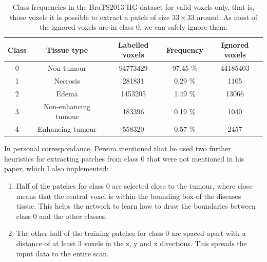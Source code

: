 \documentclass[12pt,a4paper,twoside,openright]{report}
\begin{document}
\begin{enumerate}
		\begin{table}[h]
		\centering	
		\begin{tabular}{c c S[table-format=9.0] S[table-format=2.2] S[table-format=8.0]}
		\textbf{Class} & \textbf{Tissue type} & \textbf{Labelled voxels} & \textbf{Frequency} & \textbf{Ignored voxels}\\
		  & Non tumour 				& 94773429 	& 97.45 \% & 44185403 \\ 
		1 & Necrosis 				& 281831 	& 0.29 \% & 1105\\ 
		2 & Edema					& 1453205 	& 1.49 \% & 13066\\ 
		3 & Non-enhancing tumour 	& 183396 	& 0.19 \% & 1040\\ 
		4 & Enhancing tumour		& 558320 	& 0.57 \% & 2457\\
		\end{tabular}
		\caption{Class frequencies in the BraTS2013 HG dataset for valid voxels only, that is, those voxels it is possible to extract a patch of size $33 \times 33$ around. As most of the ignored voxels are in class 0, we can safely ignore them.}
		\label{table:valid_class_frequencies}
		\end{table}
\end{enumerate}

In personal correspondance, Pereira mentioned that he used two further heuristics for extracting patches from class 0 that were not mentioned in his paper, which I also implemented:
\begin{enumerate}
	\item Half of the patches for class 0 are selected close to the tumour, where close means that the central voxel is within the bounding box of the diseases tissue. This helps the network to learn how to draw the boundaries between class 0 and the other classes.
	\item The other half of the training patches for class 0 are spaced apart with a distance of at least 3 voxels in the z, y and x directions. This spreads the input data to the entire scan.
\end{enumerate}
\end{document}
